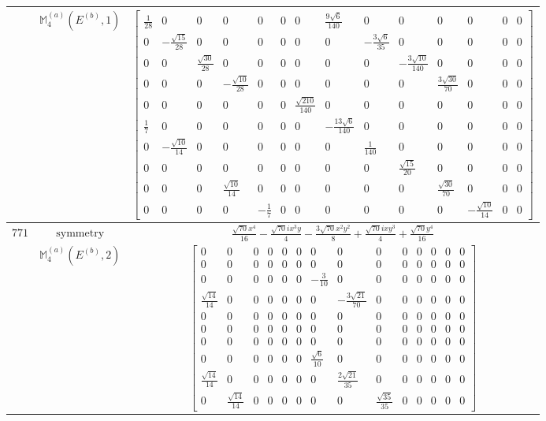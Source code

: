\documentclass[fleqn,8pt,landscape]{jsarticle}
\begin{document}
\begin{longtable}{ccc}
$  $ & $ \mathbb{M}_{4}^{(a)}(E^{(b)},1) $ & $ \begin{bmatrix} \frac{1}{28} & 0 & 0 & 0 & 0 & 0 & 0 & \frac{9 \sqrt{6}}{140} & 0 & 0 & 0 & 0 & 0 & 0 \\ 0 & - \frac{\sqrt{15}}{28} & 0 & 0 & 0 & 0 & 0 & 0 & - \frac{3 \sqrt{6}}{35} & 0 & 0 & 0 & 0 & 0 \\ 0 & 0 & \frac{\sqrt{30}}{28} & 0 & 0 & 0 & 0 & 0 & 0 & - \frac{3 \sqrt{10}}{140} & 0 & 0 & 0 & 0 \\ 0 & 0 & 0 & - \frac{\sqrt{10}}{28} & 0 & 0 & 0 & 0 & 0 & 0 & \frac{3 \sqrt{30}}{70} & 0 & 0 & 0 \\ 0 & 0 & 0 & 0 & 0 & 0 & \frac{\sqrt{210}}{140} & 0 & 0 & 0 & 0 & 0 & 0 & 0 \\ \frac{1}{7} & 0 & 0 & 0 & 0 & 0 & 0 & - \frac{13 \sqrt{6}}{140} & 0 & 0 & 0 & 0 & 0 & 0 \\ 0 & - \frac{\sqrt{10}}{14} & 0 & 0 & 0 & 0 & 0 & 0 & \frac{1}{140} & 0 & 0 & 0 & 0 & 0 \\ 0 & 0 & 0 & 0 & 0 & 0 & 0 & 0 & 0 & \frac{\sqrt{15}}{20} & 0 & 0 & 0 & 0 \\ 0 & 0 & 0 & \frac{\sqrt{10}}{14} & 0 & 0 & 0 & 0 & 0 & 0 & \frac{\sqrt{30}}{70} & 0 & 0 & 0 \\ 0 & 0 & 0 & 0 & - \frac{1}{7} & 0 & 0 & 0 & 0 & 0 & 0 & - \frac{\sqrt{10}}{14} & 0 & 0 \end{bmatrix} $ \\ \hline
$ 771 $ & $ \text{symmetry} $ & $ \frac{\sqrt{70} x^{4}}{16} - \frac{\sqrt{70} i x^{3} y}{4} - \frac{3 \sqrt{70} x^{2} y^{2}}{8} + \frac{\sqrt{70} i x y^{3}}{4} + \frac{\sqrt{70} y^{4}}{16} $ \\
$  $ & $ \mathbb{M}_{4}^{(a)}(E^{(b)},2) $ & $ \begin{bmatrix} 0 & 0 & 0 & 0 & 0 & 0 & 0 & 0 & 0 & 0 & 0 & 0 & 0 & 0 \\ 0 & 0 & 0 & 0 & 0 & 0 & 0 & 0 & 0 & 0 & 0 & 0 & 0 & 0 \\ 0 & 0 & 0 & 0 & 0 & 0 & - \frac{3}{10} & 0 & 0 & 0 & 0 & 0 & 0 & 0 \\ \frac{\sqrt{14}}{14} & 0 & 0 & 0 & 0 & 0 & 0 & - \frac{3 \sqrt{21}}{70} & 0 & 0 & 0 & 0 & 0 & 0 \\ 0 & 0 & 0 & 0 & 0 & 0 & 0 & 0 & 0 & 0 & 0 & 0 & 0 & 0 \\ 0 & 0 & 0 & 0 & 0 & 0 & 0 & 0 & 0 & 0 & 0 & 0 & 0 & 0 \\ 0 & 0 & 0 & 0 & 0 & 0 & 0 & 0 & 0 & 0 & 0 & 0 & 0 & 0 \\ 0 & 0 & 0 & 0 & 0 & 0 & \frac{\sqrt{6}}{10} & 0 & 0 & 0 & 0 & 0 & 0 & 0 \\ \frac{\sqrt{14}}{14} & 0 & 0 & 0 & 0 & 0 & 0 & \frac{2 \sqrt{21}}{35} & 0 & 0 & 0 & 0 & 0 & 0 \\ 0 & \frac{\sqrt{14}}{14} & 0 & 0 & 0 & 0 & 0 & 0 & \frac{\sqrt{35}}{35} & 0 & 0 & 0 & 0 & 0 \end{bmatrix} $ \\ \hline

\end{longtable}
\end{document}
